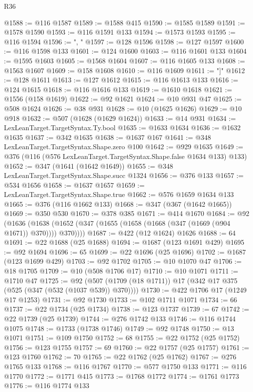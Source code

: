 \begin{lexlean}{R36}
\begin{coremodule}
@1588 := @116 @1587
@1589 := @1588 @415
@1590 := @1585 @1589
@1591 := @1578 @1590
@1593 := @116 @1591 @133
@1594 := @1573 @1593
@1595 := @116 @1594
@1596 := ", "
@1597 := @128 @1596
@1598 := @127 @1597
@1600 := @116 @1598 @133
@1601 := @124 @1600
@1603 := @116 @1601 @133
@1604 := @1595 @1603
@1605 := @1568 @1604
@1607 := @116 @1605 @133
@1608 := @1563 @1607
@1609 := @158 @1608
@1610 := @116 @1609
@1611 := "]"
@1612 := @128 @1611
@1613 := @127 @1612
@1615 := @116 @1613 @133
@1616 := @124 @1615
@1618 := @116 @1616 @133
@1619 := @1610 @1618
@1621 := @1556 (@158 @1619)
@1622 := @92 @1621
@1624 := @10 @931 @47
@1625 := @508 @1624
@1626 := @38 @931
@1628 := @10 (@1625 @1626)
@1629 := @10 @918
@1632 := @507 (@1628 (@1629 @1624))
@1633 := @14 @931
@1634 := LexLeanTarget.TargetSyntax.Ty.bool
@1635 := @1633 @1634
@1636 := @1632 @1635
@1637 := @342 @1635
@1638 := @1637 @167
@1641 := @348 LexLeanTarget.TargetSyntax.Shape.zero @100
@1642 := @929 @1635
@1649 := @376 (@116 (@576 LexLeanTarget.TargetSyntax.Shape.false @1634 @133) @133)
@1652 := @347 (@1641 (@1642 @1649))
@1655 := @348 LexLeanTarget.TargetSyntax.Shape.succ @1324
@1656 := @376 @133
@1657 := @534 @1656
@1658 := @1637 @1657
@1659 := LexLeanTarget.TargetSyntax.Shape.true
@1662 := @576 @1659 @1634 @133
@1665 := @376 (@116 @1662 @133)
@1668 := @347 (@367 (@1642 @1665))
@1669 := @350 @530
@1670 := @378 @385
@1671 := @414 @1670
@1684 := @92
    (@1636 (@1638 (@1652 (@347 (@1655 (@1658 (@1668 (@347 (@1669 (@904 @1671)) @370)))) @370))))
@1687 := @422 (@12 @1624) @1626
@1688 := 64
@1691 := @22 @1688 (@25 @1688)
@1694 := @1687 (@123 @1691 @429)
@1695 := @92 @1694
@1696 := 65
@1699 := @22 @1696 (@25 @1696)
@1702 := @1687 (@123 @1699 @429)
@1703 := @92 @1702
@1705 := @10 @1070 @47
@1706 := @18 @1705
@1709 := @10 (@508 @1706 @17)
@1710 := @10 @1071
@1711 := @1710 @47
@1725 := @92 (@507 (@1709 (@18 @1711)) @17 (@342 @17 @375 (@525 (@347 (@532 (@1037 @539)) @370))))
@1730 := @422 @1706 @17 (@1249 @17 @1253)
@1731 := @92 @1730
@1733 := @102 @1711 @1071
@1734 := 66
@1737 := @22 @1734 (@25 @1734)
@1738 := @123 @1737
@1739 := 67
@1742 := @22 @1739 (@25 @1739)
@1744 := @276 @1742 @133
@1746 := @116 @1744 @1075
@1748 := @1733 (@1738 @1746)
@1749 := @92 @1748
@1750 := @13 @1071
@1751 := @109 @1750
@1752 := 68
@1755 := @22 @1752 (@25 @1752)
@1756 := @123 @1755
@1757 := 69
@1760 := @22 @1757 (@25 @1757)
@1761 := @123 @1760
@1762 := 70
@1765 := @22 @1762 (@25 @1762)
@1767 := @276 @1765 @133
@1768 := @116 @1767
@1770 := @577 @1750 @133
@1771 := @116 @1770
@1772 := @1771 @415
@1773 := @1768 @1772
@1774 := @1761 @1773
@1776 := @116 @1774 @133

\end{coremodule}
\end{lexlean}
